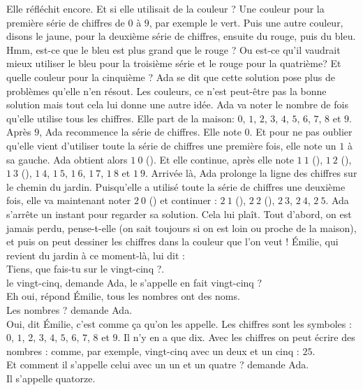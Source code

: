 Elle réfléchit encore. Et si elle utilisait de la couleur ? 
Une couleur pour la première série de chiffres de $0$ à $9$, par exemple le vert. Puis une autre couleur, disons le jaune, pour la deuxième série de chiffres, ensuite du rouge, puis du bleu. Hmm, est-ce que le bleu est plus grand que le rouge ? Ou est-ce qu’il vaudrait mieux utiliser le bleu pour la troisième série et le rouge pour la quatrième? Et quelle couleur pour la cinquième ? Ada se dit que cette solution pose plus de problèmes qu’elle n’en résout.  
Les couleurs, ce n’est peut-être pas la bonne solution mais tout cela lui donne une autre idée. Ada va noter le nombre de fois qu’elle utilise tous les chiffres. Elle part de la maison: $0$, $1$, $2$, $3$, $4$, $5$, $6$, $7$, $8$ et $9$. Après $9$, Ada recommence la série de chiffres. Elle note $0$. Et pour ne pas oublier qu’elle vient d’utiliser toute la série de chiffres une première fois, elle note un $1$ à sa gauche. Ada obtient alors $1~0$ (). Et elle continue, après elle note $1~1$ (), $1~2$ (), $1~3$ (), $1~4$, $1~5$, $1~6$, $1~7$, $1~8$ et $1~9$.
Arrivée là, Ada prolonge la ligne des chiffres sur le chemin du jardin. 
Puisqu’elle a utilisé toute la série de chiffres une deuxième fois, elle va maintenant noter $2~0$ () et continuer : $2~1$ (), $2~2$ (), $2~3$, $2~4$, $2~5$. 
Ada s'arrête un instant pour regarder sa solution. Cela lui plaît. Tout d’abord, on est jamais perdu, pense-t-elle (on sait toujours si on est loin ou proche de la maison), et puis on peut dessiner les chiffres dans la couleur que l’on veut !
Émilie, qui revient du jardin à ce moment-là, lui dit :\\
\guillemotleft Tiens, que fais-tu sur le vingt-cinq ?. \\
\mdash le vingt-cinq, demande Ada, le  s’appelle en fait vingt-cinq ?\\
\mdash Eh oui, répond Émilie, tous les nombres ont des noms.\\
\mdash Les nombres ? demande Ada.\\
\mdash Oui, dit Émilie, c’est comme ça qu'on les appelle. Les chiffres sont les symboles : $0$, $1$, $2$, $3$, $4$, $5$, $6$, $7$, $8$ et $9$. Il n’y en a que dix. Avec les chiffres on peut écrire des nombres : comme, par exemple, vingt-cinq avec un deux et un cinq : $25$.\\
\mdash Et comment il s’appelle celui avec un un et un quatre ? demande Ada.\\
\mdash Il s'appelle quatorze.\\
